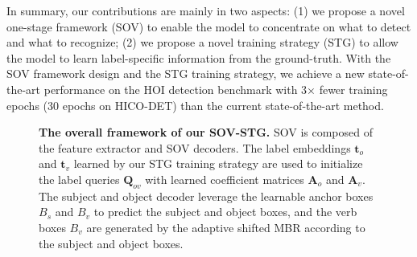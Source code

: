 \documentclass[10pt,twocolumn,letterpaper]{article}
\begin{document}
In summary, our contributions are mainly in two aspects: (1) we propose a novel one-stage framework (SOV) to enable the model to concentrate on what to detect and what to recognize;
(2) we propose a novel training strategy (STG) to allow the model to learn label-specific information from the ground-truth.
With the SOV framework design and the STG training strategy, we achieve a new state-of-the-art performance on the HOI detection benchmark with 3× fewer training epochs (30 epochs on HICO-DET) than the current state-of-the-art method.



\begin{figure*}[!ht]
    \centering
    \caption{
        \textbf{The overall framework of our SOV-STG.}
        SOV is composed of the feature extractor and SOV decoders.
The label embeddings $\bm{t}_o$ and $\bm{t}_v$ learned by our STG training strategy are used to initialize the label queries $\bm{Q}_{ov}$ with learned coefficient matrices $\bm{A}_o$ and $\bm{A}_v$.
        The subject and object decoder leverage the learnable anchor boxes $B_s$ and $B_v$ to predict the subject and object boxes, and the verb boxes $B_v$ are generated by the adaptive shifted MBR according to the subject and object boxes.
}
    \label{fig:overall_architecture}
\end{figure*}
\end{document}
